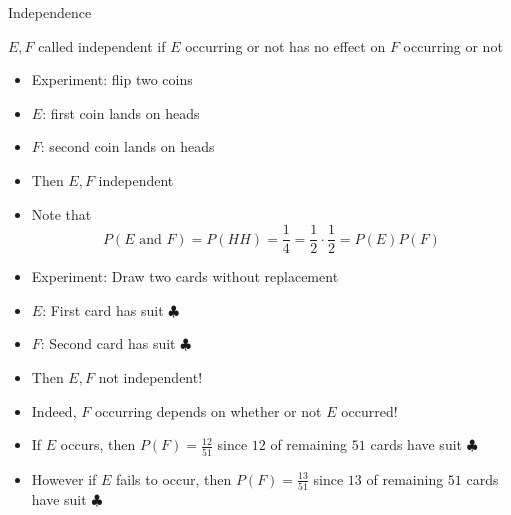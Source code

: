 \documentclass[handout]{beamer}
\theoremstyle{definition}
\begin{document}
\begin{frame}{Independence}
\begin{definition}
$E,F$ called \alert{independent} if $E$
occurring or not has no effect on $F$ occurring or not
\end{definition}
\begin{example}
\begin{itemize}
\item Experiment: flip two coins
\item $E$: first coin lands on heads
\item $F$: second coin lands on heads
\item Then $E,F$ independent
\item Note that 
\[P\left(\text{$E$ and $F$}\right)=P\left(HH\right)
=\frac{1}{4}
=\frac{1}{2}\cdot\frac{1}{2}=P\left(E\right)P\left(F\right)\]
\end{itemize}
\end{example}
\end{frame}

\begin{frame}
\begin{example}
\begin{itemize}
\item Experiment: Draw two cards without replacement
\item $E$: First card has suit $\clubsuit$
\item $F$: Second card has suit $\clubsuit$
\item Then $E,F$ \alert{not} independent!
\item Indeed, $F$ occurring depends on whether or not
$E$ occurred!
\item If $E$ occurs, then $P\left(F\right)=\frac{12}{51}$
since $12$ of remaining $51$ cards have suit $\clubsuit$
\item However if $E$ fails to occur, then $P\left(F\right)=\frac{13}{51}$
since $13$ of remaining $51$ cards have suit $\clubsuit$
\end{itemize}
\end{example}
\end{frame}
\end{document}
